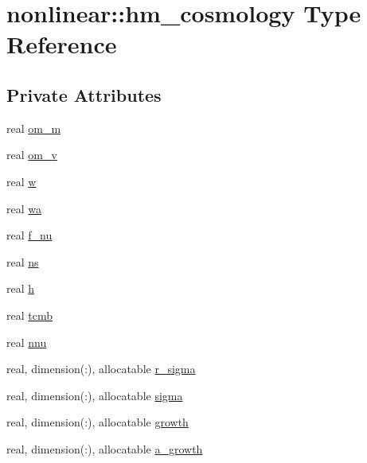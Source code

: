 \hypertarget{structnonlinear_1_1hm__cosmology}{}\section{nonlinear\+:\+:hm\+\_\+cosmology Type Reference}
\label{structnonlinear_1_1hm__cosmology}
\subsection*{Private Attributes}
\begin{DoxyCompactItemize}
\item 
real \mbox{\hyperlink{structnonlinear_1_1hm__cosmology_a078b726ddd499e98408d1ae557ac744f}{om\+\_\+m}}
\item 
real \mbox{\hyperlink{structnonlinear_1_1hm__cosmology_aa99927e914b37e7bc4eef73d9a44035e}{om\+\_\+v}}
\item 
real \mbox{\hyperlink{structnonlinear_1_1hm__cosmology_ae0dca2065662ef345c623789880556fd}{w}}
\item 
real \mbox{\hyperlink{structnonlinear_1_1hm__cosmology_a473b949bacf7fd7c8d3d6c5247dd0164}{wa}}
\item 
real \mbox{\hyperlink{structnonlinear_1_1hm__cosmology_ae07efa43a837bdffc185f3fb9be40445}{f\+\_\+nu}}
\item 
real \mbox{\hyperlink{structnonlinear_1_1hm__cosmology_a667e63d4f5ef90f6f9e345ee255caf8c}{ns}}
\item 
real \mbox{\hyperlink{structnonlinear_1_1hm__cosmology_a7389785478da785cb704e77cad03c690}{h}}
\item 
real \mbox{\hyperlink{structnonlinear_1_1hm__cosmology_a05bec38f0028ecd64f0eb04413ad0eeb}{tcmb}}
\item 
real \mbox{\hyperlink{structnonlinear_1_1hm__cosmology_a7a359ea8b41205de536dfa59c4cd77c9}{nnu}}
\item 
real, dimension(\+:), allocatable \mbox{\hyperlink{structnonlinear_1_1hm__cosmology_abd7c7ef9478e1af53ad3d6c32e65819a}{r\+\_\+sigma}}
\item 
real, dimension(\+:), allocatable \mbox{\hyperlink{structnonlinear_1_1hm__cosmology_ab467e1987ad7d2e07e1cb9a9473e37e3}{sigma}}
\item 
real, dimension(\+:), allocatable \mbox{\hyperlink{structnonlinear_1_1hm__cosmology_a11d4378a2f9f0ad85804bbe7e308e1dd}{growth}}
\item 
real, dimension(\+:), allocatable \mbox{\hyperlink{structnonlinear_1_1hm__cosmology_a2aae32088cb58980a79d6183a19c5507}{a\+\_\+growth}}

\end{DoxyCompactItemize}
